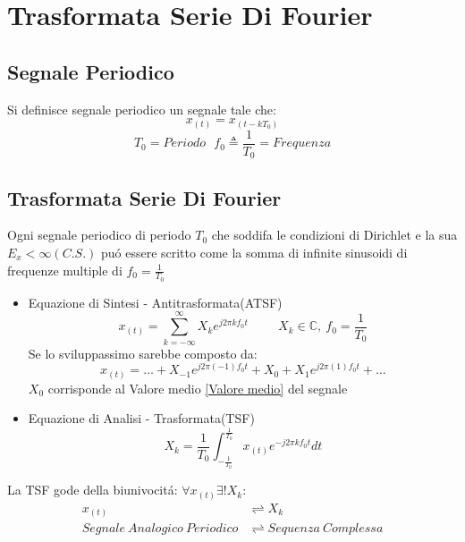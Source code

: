 \section{Trasformata Serie Di Fourier}
    \subsection{Segnale Periodico}
        Si definisce segnale periodico un segnale tale che:
        \[
            x_{(t)} = x_{(t-kT_0)}    
        \]
        \[
            T_0=Periodo\ \ \ f_0\triangleq \frac{1}{T_0} =Frequenza
        \]
    \subsection{Trasformata Serie Di Fourier}
        Ogni segnale periodico di periodo $T_0$ che soddifa le condizioni di Dirichlet e la sua $E_x < \infty (C.S.)$ puó essere scritto come la somma di 
        infinite sinusoidi di frequenze multiple di $f_0 = \frac{1}{T_0}$
        \begin{itemize}
            \item{Equazione di Sintesi - Antitrasformata(ATSF)\label{ATSF}
                \[
                    x_{(t)} = \sum_{k = -\infty}^{\infty} X_{k} e^{j2\pi kf_0t} \hspace{1cm} X_{k}\in \mathbb{C},\ f_0 = \frac{1}{T_0} 
                \]
                Se lo sviluppassimo sarebbe composto da:
                \[
                   x_{(t)} =\ldots  + X_{-1} e^{j2\pi (-1)f_0t} + X_{0} + X_{1} e^{j2\pi (1) f_0t} + \ldots 
                \]
                $X_0$ corrisponde al Valore medio \ref{Valore medio} del segnale
            }
            \item{Equazione di Analisi - Trasformata(TSF)\label{TSF}
                \[
                    X_k =\frac{1}{T_0}\int_{-\frac{1}{T_0}}^{\frac{1}{T_0}} x_{(t)} e^{-j2\pi kf_0t} dt
                \]
            } 
        \end{itemize}
        La TSF gode della biunivocitá: $\forall x_{(t)} \exists! X_k$:
        \begin{align}
            x_{(t)} & \rightleftharpoons X_k  \nonumber\\
            Segnale\ Analogico\ Periodico &\rightleftharpoons Sequenza\ Complessa \nonumber
        \end{align}
